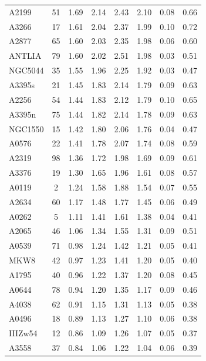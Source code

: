 \documentclass[10pt,aps,pra,reprint,amsmath,amsfonts,amssymb,showpacs,nofootinbib,floatfix]{revtex4-1}
\begin{document}
\begin{table}
\begin{minipage}{2.0\columnwidth}
\begin{tabular}{l  c c c c c c c}
A2199    &  51 &   1.69 &   2.14 &   2.43 &   2.10 &   0.08 &   0.66 \\
A3266    &  17 &   1.61 &   2.04 &   2.37 &   1.99 &   0.10 &   0.72 \\
A2877    &  65 &   1.60 &   2.03 &   2.35 &   1.98 &   0.06 &   0.60 \\
ANTLIA   &  79 &   1.60 &   2.02 &   2.51 &   1.98 &   0.03 &   0.51 \\
NGC5044  &  35 &   1.55 &   1.96 &   2.25 &   1.92 &   0.03 &   0.47 \\
A3395s   &  21 &   1.45 &   1.83 &   2.14 &   1.79 &   0.09 &   0.63 \\
A2256    &  54 &   1.44 &   1.83 &   2.12 &   1.79 &   0.10 &   0.65 \\
A3395n   &  75 &   1.44 &   1.82 &   2.14 &   1.78 &   0.09 &   0.63 \\
NGC1550  &  15 &   1.42 &   1.80 &   2.06 &   1.76 &   0.04 &   0.47 \\
A0576    &  22 &   1.41 &   1.78 &   2.07 &   1.74 &   0.08 &   0.59 \\
A2319    &  98 &   1.36 &   1.72 &   1.98 &   1.69 &   0.09 &   0.61 \\
A3376    &  19 &   1.30 &   1.65 &   1.96 &   1.61 &   0.08 &   0.57 \\
A0119    &   2 &   1.24 &   1.58 &   1.88 &   1.54 &   0.07 &   0.55 \\
A2634    &  60 &   1.17 &   1.48 &   1.77 &   1.45 &   0.06 &   0.49 \\
A0262    &   5 &   1.11 &   1.41 &   1.61 &   1.38 &   0.04 &   0.41 \\
A2065    &  46 &   1.06 &   1.34 &   1.55 &   1.31 &   0.09 &   0.51 \\
A0539    &  71 &   0.98 &   1.24 &   1.42 &   1.21 &   0.05 &   0.41 \\
MKW8     &  42 &   0.97 &   1.23 &   1.41 &   1.20 &   0.05 &   0.40 \\
A1795    &  40 &   0.96 &   1.22 &   1.37 &   1.20 &   0.08 &   0.45 \\
A0644    &  78 &   0.94 &   1.20 &   1.35 &   1.17 &   0.09 &   0.46 \\
A4038    &  62 &   0.91 &   1.15 &   1.31 &   1.13 &   0.05 &   0.38 \\
A0496    &  18 &   0.89 &   1.13 &   1.27 &   1.10 &   0.06 &   0.38 \\
IIIZw54  &  12 &   0.86 &   1.09 &   1.26 &   1.07 &   0.05 &   0.37 \\
A3558    &  37 &   0.84 &   1.06 &   1.22 &   1.04 &   0.06 &   0.39 \\

\end{tabular}
\end{minipage}
\end{table}
\end{document}
